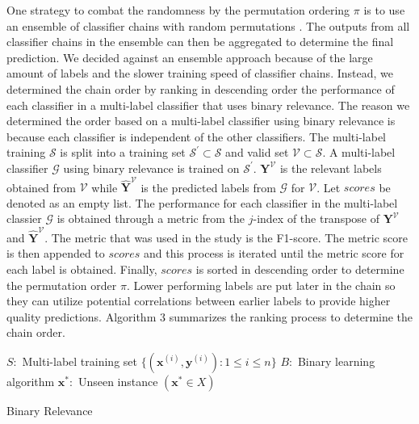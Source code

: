 \documentclass[sn-mathphys,Numbered]{sn-jnl}%
\theoremstyle{thmstyleone}%
\theoremstyle{thmstyletwo}%
\theoremstyle{thmstylethree}%
\begin{document}
One strategy to combat the randomness by the permutation ordering $\pi$ is to use an ensemble of classifier chains with random permutations \cite{zhangBinaryRelevanceMultilabel2018}.
The outputs from all classifier chains in the ensemble can then be aggregated to determine the final prediction. 
We decided against an ensemble approach because of the large amount of labels and the slower training speed of classifier chains.
Instead, we determined the chain order by ranking in descending order the performance of each classifier in a multi-label classifier that uses binary relevance.
The reason we determined the order based on a multi-label classifier using binary relevance is because each classifier is independent of the other classifiers.
The multi-label training $\mathcal{S}$ is split into a training set $\mathcal{S}^{'} \subset \mathcal{S}$ and valid set $\mathcal{V} \subset \mathcal{S}$.
A multi-label classifier $\mathcal{G}$ using binary relevance is trained on $\mathcal{S}^{'}$.
$\textbf{Y}^{\mathcal{V}}$ is the relevant labels obtained from $\mathcal{V}$ while $\mathbf{\hat{Y}}^{\mathcal{V}}$ is the predicted labels from $\mathcal{G}$ for $\mathcal{V}$.
Let $scores$ be denoted as an empty list.
The performance for each classifier in the multi-label classier $\mathcal{G}$ is obtained through a metric from the $j$-index of the transpose of $\textbf{Y}^{\mathcal{V}}$ and $\mathbf{\hat{Y}}^{\mathcal{V}}$.
The metric that was used in the study is the F1-score.
The metric score is then appended to $scores$ and this process is iterated until the metric score for each label is obtained.
Finally, $scores$ is sorted in descending order to determine the permutation order $\pi$.
Lower performing labels are put later in the chain so they can utilize potential correlations between earlier labels to provide higher quality predictions.
Algorithm 3 summarizes the ranking process to determine the chain order.

\begin{algorithm}
\KwIn{}
$S:$ Multi-label training set $\{ (\textbf{x}^{(i)},\textbf{y}^{(i)}) : 1 \leqslant i \leqslant n \}$\;
$B:$ Binary learning algorithm\;
$\textbf{x}^*:$ Unseen instance $(\textbf{x}^*\in X)$\;
\caption{Binary Relevance \cite{zhangBinaryRelevanceMultilabel2018}}\label{alg:1}
\end{algorithm}
\end{document}
